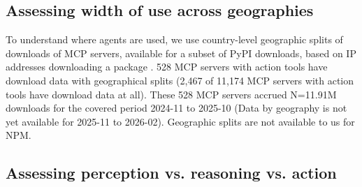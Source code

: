 \documentclass[manuscript,screen,nonacm,oneside]{acmart}
\begin{document}
\subsection{Assessing width of use across geographies}
\label{sec:geo-tools}

To understand where agents are used, we use country-level geographic splits of downloads of MCP servers, available for a subset of PyPI downloads, based on IP addresses downloading a package \citep{githubGitHubPypilinehaulcloudfunction}. 528 MCP servers with action tools have download data with geographical splits (2,467 of 11,174 MCP servers with action tools have download data at all). These 528 MCP servers accrued N=11.91M downloads for the covered period 2024-11 to 2025-10 (Data by geography is not yet available for 2025-11 to 2026-02). Geographic splits are not available to us for NPM.

\subsection{Assessing perception vs. reasoning vs. action}
\label{sec:direct-impact}
\end{document}
